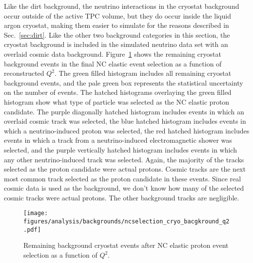     Like the dirt background, the neutrino interactions in the cryostat
    background occur outside of the active TPC volume, but they do occur inside
    the liquid argon cryostat, making them easier to simulate for the reasons
    described in Sec.~\ref{sec:dirt}. Like the other two background categories
    in this section, the cryostat background is included in the simulated
    neutrino data set with an overlaid cosmic data background.
    Figure~\ref{fig:selectedcryo} shows the remaining cryostat background
    events in the final NC elastic event selection as a function of
    reconstructed $Q^2$. The green filled histogram includes all remaining
    cryostat background events, and the pale green box represents the
    statistical uncertainty on the number of events. The hatched histograms
    overlaying the green filled histogram show what type of particle was
    selected as the NC elastic proton candidate. The purple diagonally hatched
    histogram includes events in which an overlaid cosmic track was selected,
    the blue hatched histogram includes events in which a neutrino-induced
    proton was selected, the red hatched histogram includes events in which a
    track from a neutrino-induced electromagnetic shower was selected, and the
    purple vertically hatched histogram includes events in which any other
    neutrino-induced track was selected. Again, the majority of the tracks
    selected as the proton candidate were actual protons. Cosmic tracks are the
    next most common track selected as the proton candidate in these events.
    Since real cosmic data is used as the background, we don't know how many of
    the selected cosmic tracks were actual protons. The other background tracks
    are negligible.
    \begin{figure}[ht]
      \centering
      \texttt{[image: figures/analysis/backgrounds/ncselection\_cryo\_bacgkround\_q2.pdf]}
      \caption{Remaining background cryostat events after NC elastic proton
      event selection as a function of $Q^2$.}
      \label{fig:selectedcryo}
    \end{figure}

